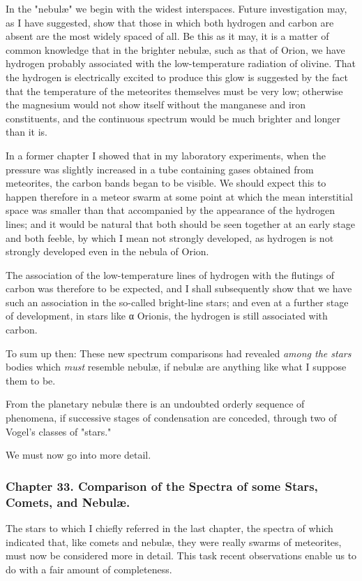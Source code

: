 \documentclass[a4paper, 12pt, oneside, polutonikogreek, english]{article}
\begin{document}
In the "nebulæ" we begin with the widest interspaces. Future investigation may, as I have suggested, show that those in which both hydrogen and carbon are absent are the most widely spaced of all. Be this as it may, it is a matter of common knowledge that in the brighter nebulæ, such as that of Orion, we have hydrogen probably associated with the low-temperature radiation of olivine. That the hydrogen is electrically excited to produce this glow is suggested by the fact that the temperature of the meteorites themselves must be very low; otherwise the magnesium would not show itself without the manganese and iron constituents, and the continuous spectrum would be much brighter and longer than it is.

In a former chapter I showed that in my laboratory experiments, when the pressure was slightly increased in a tube containing gases obtained from meteorites, the carbon bands began to be visible. We should expect this to happen therefore in a meteor swarm at some point at which the mean interstitial space was smaller than that accompanied by the appearance of the hydrogen lines; and it would be natural that both should be seen together at an early stage and both feeble, by which I mean not strongly developed, as hydrogen is not strongly developed even in the nebula of Orion.

The association of the low-temperature lines of hydrogen with the flutings of carbon was therefore to be expected, and I shall subsequently show that we have such an association in the so-called bright-line stars; and even at a further stage of development, in stars like α Orionis, the hydrogen is still associated with carbon.

To sum up then: These new spectrum comparisons had revealed \emph{among the stars} bodies which \emph{must} resemble nebulæ, if nebulæ are anything like what I suppose them to be.

From the planetary nebulæ there is an undoubted orderly sequence of phenomena, if successive stages of condensation are conceded, through two of Vogel's classes of "stars."

We must now go into more detail.

\subsubsection{Chapter 33. Comparison of the Spectra of some Stars, Comets, and Nebulæ.}

The stars to which I chiefly referred in the last chapter, the spectra of which indicated that, like comets and nebulæ, they were really swarms of meteorites, must now be considered more in detail. This task recent observations enable us to do with a fair amount of completeness.
\end{document}
